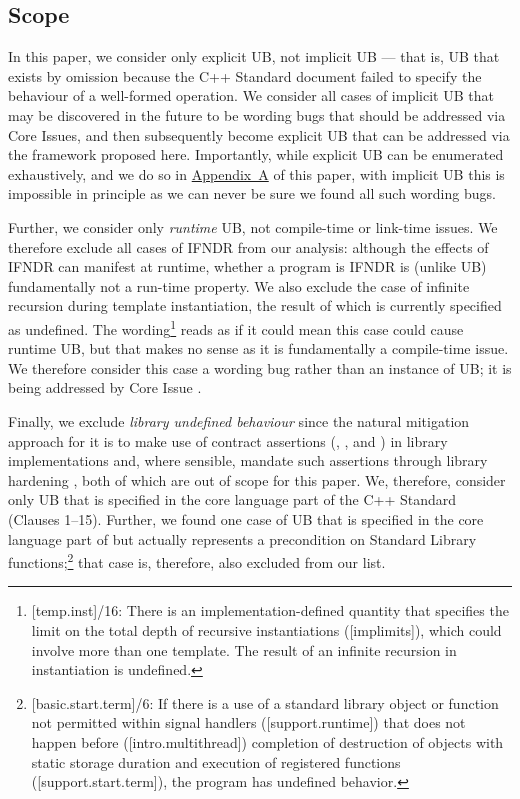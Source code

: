 \subsection{Scope}

In this paper, we consider only explicit UB, not implicit UB --- that is, UB that exists by omission because the C++ Standard document failed to specify the behaviour of a well-formed operation. We consider all cases of implicit UB that may be discovered in the future to be wording bugs that should be addressed via Core Issues, and then subsequently become explicit UB that can be addressed  via the framework proposed here. Importantly, while explicit UB can be enumerated exhaustively, and we do so in \hyperref[appendix]{Appendix~A} of this paper, with implicit UB this is impossible in principle as we can never be sure we found all such wording bugs.

Further, we consider only \emph{runtime} UB, not compile-time or link-time issues. We therefore exclude all cases of IFNDR from our analysis: although the effects of IFNDR can manifest at runtime, whether a program is IFNDR is (unlike UB) fundamentally not a run-time property. We also exclude the case of infinite recursion during template instantiation, the result of which is currently specified as undefined. The wording\footnote{[temp.inst]/16: There is an implementation-defined quantity that specifies the limit on the total depth of recursive instantiations ([implimits]), which could involve more than one template. The result of an infinite recursion in instantiation is undefined.}  reads as if it could mean this case could cause runtime UB, but that makes no sense as it is fundamentally a compile-time issue. We therefore consider this case a wording bug rather than an instance of UB; it is being addressed by Core Issue \cite{CWG3034}.

Finally, we exclude \emph{library undefined behaviour} since the natural mitigation approach for it is to make use of contract assertions (, , and ) in library implementations and, where sensible, mandate such assertions through library hardening \cite{P3471R4}, both of which are out of scope for this paper. We, therefore, consider only UB that is specified in the core language part of the C++ Standard (Clauses 1--15). Further, we found one case of UB that is specified in the core language part of \cite{N5008} but actually represents a precondition on Standard Library functions;\footnote{[basic.start.term]/6: If there is a use of a standard library object or function not permitted within signal handlers ([support.runtime]) that does not happen before ([intro.multithread]) completion of destruction of objects with static storage duration and execution of  registered functions ([support.start.term]), the program has undefined behavior.}
that case is, therefore, also excluded from our list.



